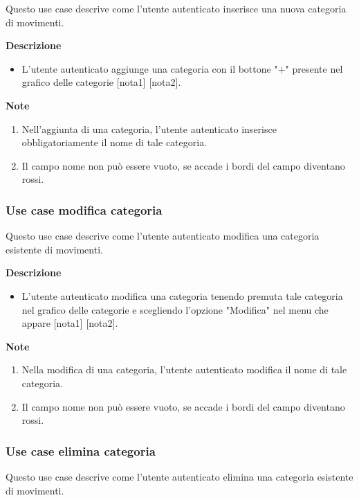 \documentclass[a4paper,12pt]{article}
\begin{document}
Questo use case descrive come l'utente autenticato inserisce una nuova categoria di movimenti.

\textbf{Descrizione}
\begin{itemize} \setlength\itemsep{0.01em}
\item L'utente autenticato aggiunge una categoria con il bottone "+" presente nel grafico delle categorie [nota1] [nota2].
\end{itemize}

\textbf{Note}
\begin{enumerate} \setlength\itemsep{0.01em}
\item Nell'aggiunta di una categoria, l'utente autenticato inserisce obbligatoriamente il nome di tale categoria.
\item Il campo nome non può essere vuoto, se accade i bordi del campo diventano rossi.
\end{enumerate}




\subsubsection*{Use case modifica categoria}

Questo use case descrive come l'utente autenticato modifica una categoria esistente di movimenti.

\textbf{Descrizione}
\begin{itemize} \setlength\itemsep{0.01em}
\item L'utente autenticato modifica una categoria tenendo premuta tale categoria nel grafico delle categorie e scegliendo l'opzione "Modifica" nel menu che appare [nota1] [nota2].
\end{itemize}

\textbf{Note}
\begin{enumerate} \setlength\itemsep{0.01em}
\item Nella modifica di una categoria, l'utente autenticato modifica il nome di tale categoria.
\item Il campo nome non può essere vuoto, se accade i bordi del campo diventano rossi.
\end{enumerate}



\subsubsection*{Use case elimina categoria}

Questo use case descrive come l'utente autenticato elimina una categoria esistente di movimenti.
\end{document}
